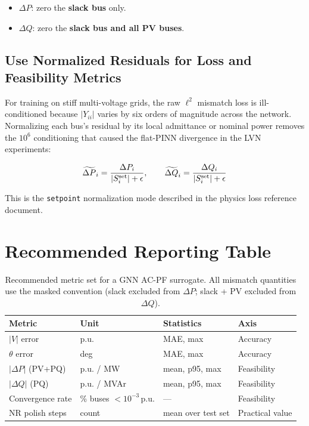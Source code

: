 \documentclass{article}
\begin{document}
\begin{itemize}[noitemsep]
  \item $\Delta P$: zero the \textbf{slack bus} only.
  \item $\Delta Q$: zero the \textbf{slack bus and all PV buses}.
\end{itemize}

\subsection{Use Normalized Residuals for Loss and Feasibility Metrics}

For training on stiff multi-voltage grids, the raw $\ell^2$ mismatch
loss is ill-conditioned because $|Y_{ii}|$ varies by six orders of
magnitude across the network.  Normalizing each bus's residual by its
local admittance or nominal power removes the $10^6$ conditioning that
caused the flat-PINN divergence in the LVN experiments:

\begin{equation}
  \widetilde{\Delta P}_i = \frac{\Delta P_i}{|S_i^{\rm set}| + \epsilon},
  \qquad
  \widetilde{\Delta Q}_i = \frac{\Delta Q_i}{|S_i^{\rm set}| + \epsilon}
\end{equation}

This is the \texttt{setpoint} normalization mode described in the physics
loss reference document.

\section{Recommended Reporting Table}

\begin{table}[h]
\centering
\caption{Recommended metric set for a GNN AC-PF surrogate.
  All mismatch quantities use the masked convention
  (slack excluded from $\Delta P$; slack + PV excluded from $\Delta Q$).}
\label{tab:report}
\begin{tabular}{llll}
\toprule
Metric & Unit & Statistics & Axis \\
\midrule
$|V|$ error & p.u. & MAE, max & Accuracy \\
$\theta$ error & deg & MAE, max & Accuracy \\
$|\Delta P|$ (PV+PQ) & p.u. / MW & mean, p95, max & Feasibility \\
$|\Delta Q|$ (PQ)    & p.u. / MVAr & mean, p95, max & Feasibility \\
Convergence rate & \% buses $< 10^{-3}$\,p.u. & — & Feasibility \\
NR polish steps & count & mean over test set & Practical value \\
\bottomrule
\end{tabular}
\end{table}
\end{document}
